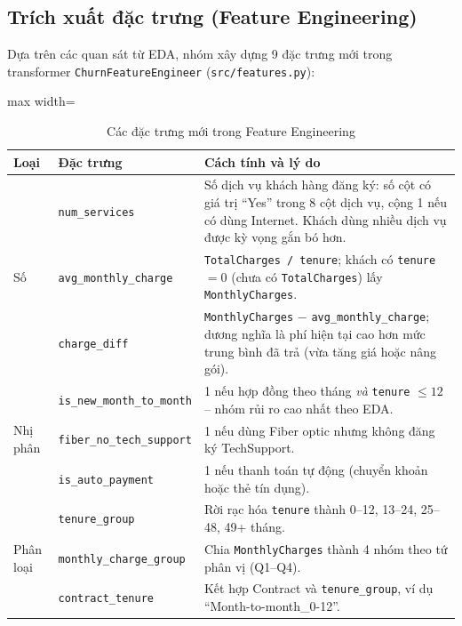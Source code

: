 \subsection{Trích xuất đặc trưng (Feature Engineering)}\label{sec:fe}
Dựa trên các quan sát từ EDA, nhóm xây dựng 9 đặc trưng mới trong transformer \texttt{ChurnFeatureEngineer} (\texttt{src/features.py}):

\begin{table}[H]
\centering
\begin{adjustbox}{max width=\textwidth}
\begin{tabular}{|l|l|p{8.3cm}|}
\hline
\textbf{Loại} & \textbf{Đặc trưng} & \textbf{Cách tính và lý do} \\
\hline
\multirow{3}{*}{Số} & \texttt{num\_services} & Số dịch vụ khách hàng đăng ký: số cột có giá trị ``Yes'' trong 8 cột dịch vụ, cộng 1 nếu có dùng Internet. Khách dùng nhiều dịch vụ được kỳ vọng gắn bó hơn. \\
\cline{2-3}
 & \texttt{avg\_monthly\_charge} & \texttt{TotalCharges / tenure}; khách có \texttt{tenure} $=0$ (chưa có \texttt{TotalCharges}) lấy \texttt{MonthlyCharges}. \\
\cline{2-3}
 & \texttt{charge\_diff} & \texttt{MonthlyCharges} $-$ \texttt{avg\_monthly\_charge}; dương nghĩa là phí hiện tại cao hơn mức trung bình đã trả (vừa tăng giá hoặc nâng gói). \\
\hline
\multirow{3}{*}{Nhị phân} & \texttt{is\_new\_month\_to\_month} & 1 nếu hợp đồng theo tháng \textit{và} \texttt{tenure} $\le 12$ -- nhóm rủi ro cao nhất theo EDA. \\
\cline{2-3}
 & \texttt{fiber\_no\_tech\_support} & 1 nếu dùng Fiber optic nhưng không đăng ký TechSupport. \\
\cline{2-3}
 & \texttt{is\_auto\_payment} & 1 nếu thanh toán tự động (chuyển khoản hoặc thẻ tín dụng). \\
\hline
\multirow{3}{*}{Phân loại} & \texttt{tenure\_group} & Rời rạc hóa \texttt{tenure} thành 0--12, 13--24, 25--48, 49+ tháng. \\
\cline{2-3}
 & \texttt{monthly\_charge\_group} & Chia \texttt{MonthlyCharges} thành 4 nhóm theo tứ phân vị (Q1--Q4). \\
\cline{2-3}
 & \texttt{contract\_tenure} & Kết hợp Contract và \texttt{tenure\_group}, ví dụ ``Month-to-month\_0-12''. \\
\hline
\end{tabular}
\end{adjustbox}
\caption{Các đặc trưng mới trong Feature Engineering}
\end{table}

